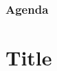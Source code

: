 \documentclass{beamer}
\begin{document}
\begin{frame}
\frametitle{Agenda}
\tableofcontents %
\end{frame}

\section{Title}
\begin{frame}
\end{frame}
\end{document}
